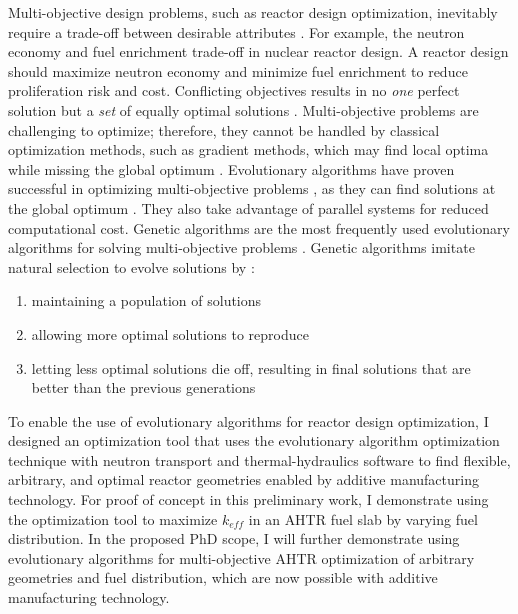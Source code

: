 Multi-objective design problems, such as reactor design optimization, 
inevitably require a trade-off between desirable attributes 
\cite{byrne_evolving_2014,simon_sciences_2019}. 
For example, the neutron economy and fuel enrichment trade-off in nuclear 
reactor design. 
A reactor design should maximize neutron economy and minimize fuel enrichment 
to reduce proliferation risk and cost. 
Conflicting objectives results in no \textit{one} perfect solution but 
a \textit{set} of equally optimal solutions \cite{byrne_evolving_2014}.
Multi-objective problems are challenging to optimize; therefore, they cannot be 
handled by classical optimization methods, such as gradient methods, which may 
find local optima while missing the global optimum \cite{renner_genetic_2003}. 
Evolutionary algorithms have proven successful in optimizing multi-objective problems 
\cite{krish_practical_2011}, as they can find solutions at the global 
optimum \cite{renner_genetic_2003}.
They also take advantage of parallel systems for reduced computational cost.
Genetic algorithms are the most frequently used evolutionary algorithms for 
solving multi-objective problems \cite{byrne_evolving_2014, krish_practical_2011}.
Genetic algorithms imitate natural selection to evolve solutions by 
\cite{renner_genetic_2003}: 
\begin{enumerate}
    \item maintaining a population of solutions
    \item allowing more optimal solutions to reproduce
    \item letting less optimal solutions die off, resulting in final solutions that are 
    better than the previous generations
\end{enumerate} 

To enable the use of evolutionary algorithms for reactor design optimization,
I designed an optimization tool that uses the evolutionary algorithm optimization 
technique with neutron transport and thermal-hydraulics software to find flexible, 
arbitrary, and optimal reactor geometries enabled by additive manufacturing technology. 
For proof of concept in this preliminary work, I demonstrate using the 
optimization tool to maximize $k_{eff}$ in an \gls{AHTR} fuel slab by varying 
fuel distribution. 
In the proposed PhD scope, I will further demonstrate using evolutionary 
algorithms for multi-objective \gls{AHTR} optimization of arbitrary geometries 
and fuel distribution, which are now possible with additive manufacturing 
technology. 

